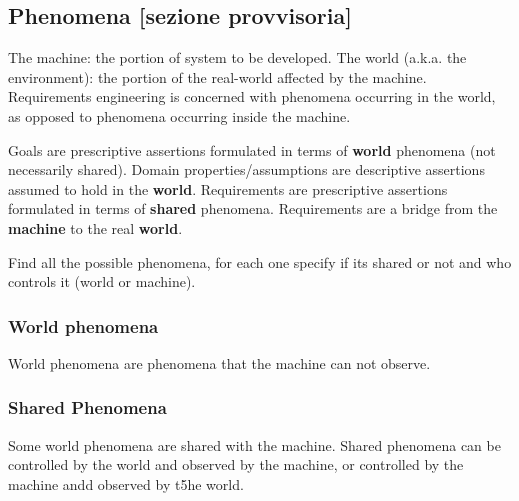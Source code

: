 \subsection{Phenomena [sezione provvisoria]}
\label{subsect:phenomena}

The machine: the portion of system to be developed.
The world (a.k.a. the environment): the portion of the real-world affected by the machine.
Requirements engineering is concerned with phenomena occurring in the world, as opposed to phenomena occurring inside the machine.

Goals are prescriptive assertions formulated in terms of \textbf{world} phenomena (not necessarily shared).
Domain properties/assumptions are descriptive assertions assumed to hold in the \textbf{world}.
Requirements are prescriptive assertions formulated in terms of \textbf{shared} phenomena.
Requirements are a bridge from the \textbf{machine} to the real \textbf{world}.

Find all the possible phenomena, for each one specify if its shared or not and who controls it (world or machine). 

\subsubsection{World phenomena}
\label{subsubsect:worldphenomena}

World phenomena are phenomena that the machine can not observe.

\subsubsection{Shared Phenomena}
\label{subsubsect:sharedphenomena}

Some world phenomena are shared with the machine.
Shared phenomena can be controlled by the world and observed by the machine, or controlled by the machine andd observed by t5he world.
